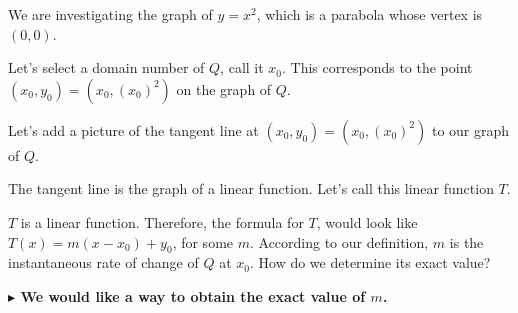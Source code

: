 \documentclass{ximera}
\begin{document}
We are investigating the graph of $y = x^2$, which is a parabola whose vertex is $(0, 0)$. 

Let's select a domain number of $Q$, call it $x_0$.   This corresponds to the point $(x_0, y_0) = (x_0, (x_0)^2)$ on the graph of $Q$.

Let's add a picture of the tangent line at $(x_0, y_0) = (x_0, (x_0)^2)$ to our graph of $Q$.


\begin{image}
\end{image}

The tangent line is the graph of a linear function. Let's call this linear function $T$.


$T$ is a linear function. Therefore, the formula for $T$, would look like $T(x) = m(x - x_0) + y_0$, for some $m$.  According to our definition, $m$ is the instantaneous rate of change of $Q$ at $x_0$.  How do we determine its exact value?



\textbf{\textcolor{blue!55!black}{$\blacktriangleright$ We would like a way to obtain the exact value of $m$.}} 
\end{document}
